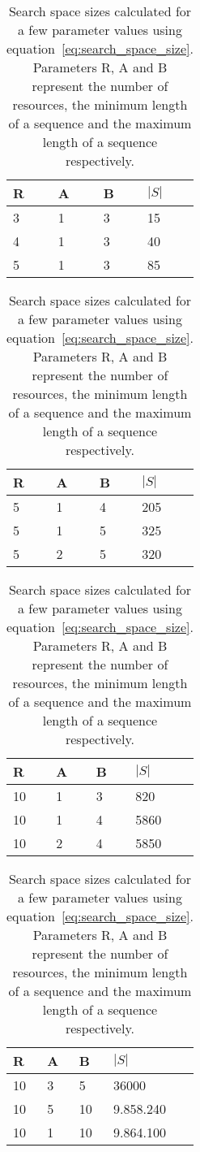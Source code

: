 \begin{table}
	\begin{minipage}{0.24\linewidth}
	\centering
	\begin{tabular}{l|l|l||l}
		\textbf{R} & \textbf{A} & \textbf{B} & \textbf{$|S|$} \\\hline\hline
		3 & 1 & 3 & 15 \\\hline
		4 & 1 & 3 & 40 \\\hline
		5 & 1 & 3 & 85 \\\hline
	\end{tabular}
	\end{minipage}
	\begin{minipage}{0.24\linewidth}
	\centering
	\begin{tabular}{l|l|l||l}
		\textbf{R} & \textbf{A} & \textbf{B} & \textbf{$|S|$} \\\hline\hline
		5 & 1 & 4 & 205 \\\hline
		5 & 1 & 5 & 325 \\\hline
		5 & 2 & 5 & 320 \\\hline
	\end{tabular}
	\end{minipage}
	\begin{minipage}{0.24\linewidth}
	\centering
	\begin{tabular}{l|l|l||l}
		\textbf{R} & \textbf{A} & \textbf{B} & \textbf{$|S|$} \\\hline\hline
		10 & 1 & 3 & 820 \\\hline
		10 & 1 & 4 & 5860 \\\hline
		10 & 2 & 4 & 5850 \\\hline
	\end{tabular}
	\end{minipage}
	\begin{minipage}{0.26\linewidth}
	\centering
	\begin{tabular}{l|l|l||l}
		\textbf{R} & \textbf{A} & \textbf{B} & \textbf{$|S|$} \\\hline\hline
		10 & 3 & 5 & 36000 \\\hline
		10 & 5 & 10 & 9.858.240 \\\hline
		10 & 1 & 10 & 9.864.100 \\\hline
	\end{tabular}
	\end{minipage}
	\caption[Search space size]{Search space sizes calculated for a few parameter values using
		equation~\eqref{eq:search_space_size}. Parameters R, A and B represent
	the number of resources, the minimum length of a sequence and the maximum
length of a sequence respectively.}
	\label{tab:search_space_sizes}
\end{table}

